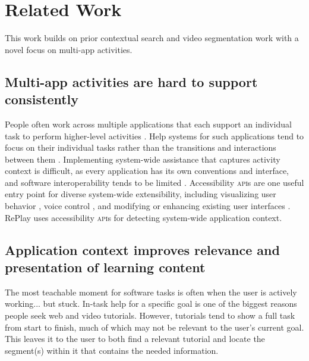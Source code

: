 \section{Related Work}
This work builds on prior contextual search and video segmentation work with a novel focus on multi-app activities.

\subsection{Multi-app activities are hard to support consistently}
People often work across multiple applications that each support an individual task to perform higher-level activities \cite{Sumner1997}. Help systems for such applications tend to focus on their individual tasks rather than the transitions and interactions between them \cite{Norman2005}. Implementing system-wide assistance that captures activity context is difficult, as every application has its own conventions and interface, and software interoperability tends to be limited \cite{Beaudouin-Lafon2018}. Accessibility \textsc{api}s are one useful entry point for diverse system-wide extensibility, including visualizing user behavior \cite{Matejka2013}, voice control \cite{Li2017, Zhong2014}, and modifying or enhancing existing user interfaces \cite{Dixon2014, Stuerzlinger2006, Chang2011}.
RePlay uses accessibility \textsc{api}s for detecting system-wide application context.

\subsection{Application context improves relevance and presentation of learning content}
The most teachable moment for software tasks is often when the user is actively working... but stuck. In-task help for a specific goal is one of the biggest reasons people seek web \cite{Lafreniere2013a} and video \cite{AlamAnik2015} tutorials. However, tutorials tend to show a full task from start to finish, much of which may not be relevant to the user's current goal. This leaves it to the user to both find a relevant tutorial and locate the segment(s) within it that contains the needed information.

